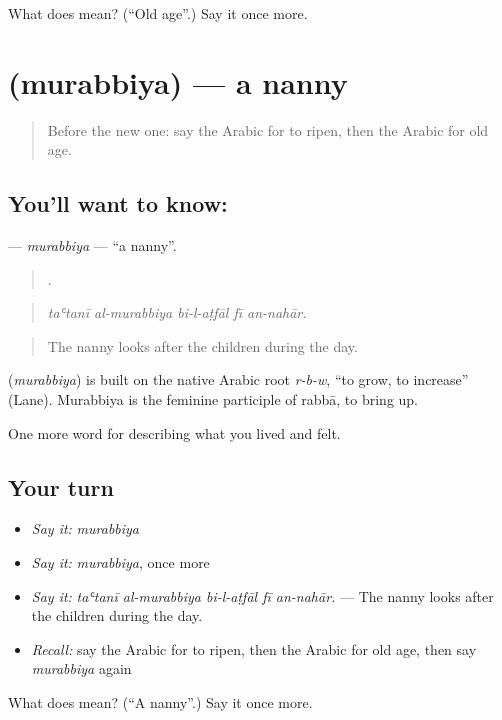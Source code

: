 \begin{tcolorbox}[breakable,colback=teal!4,colframe=teal!35!black,title={Before you move on}]
What does  mean? (\textquotedblleft{}Old age\textquotedblright{}.) Say it once more.
\end{tcolorbox}
\section[\texorpdfstring{\ar{مربية} (murabbiya)}{مربية (murabbiya)}]{ (murabbiya) — a nanny}

\label{lesson:AR-C531-murabbiya}



\begin{quote}
Before the new one: say the Arabic for to ripen, then the Arabic for old age.
\end{quote}

\subsection*{You'll want to know: }
\textbf{} — \emph{murabbiya} — \textquotedblleft{}a nanny\textquotedblright{}.

\begin{quote}
    .
\end{quote}

\begin{quote}
\emph{taʿtanī al-murabbiya bi-l-aṭfāl fī an-nahār.}
\end{quote}

\begin{quote}
The nanny looks after the children during the day.
\end{quote}

\begin{cousinweb}
\textbf{} (\emph{murabbiya}) is built on the native Arabic root \emph{r-b-w}, \textquotedblleft{}to grow, to increase\textquotedblright{} (Lane). Murabbiya is the feminine participle of rabbā, to bring up.
\end{cousinweb}

\begin{grammarlens}[title={What you've built}]
One more word for describing what you lived and felt.
\end{grammarlens}

\subsection*{Your turn}
\begin{itemize}
\raggedright
  \item \emph{Say it:} \emph{murabbiya}
  \item \emph{Say it:} \emph{murabbiya}, once more
  \item \emph{Say it:} \emph{taʿtanī al-murabbiya bi-l-aṭfāl fī an-nahār.} — The nanny looks after the children during the day.
  \item \emph{Recall:} say the Arabic for to ripen, then the Arabic for old age, then say \emph{murabbiya} again
\end{itemize}

\begin{tcolorbox}[breakable,colback=teal!4,colframe=teal!35!black,title={Before you move on}]
What does  mean? (\textquotedblleft{}A nanny\textquotedblright{}.) Say it once more.
\end{tcolorbox}
